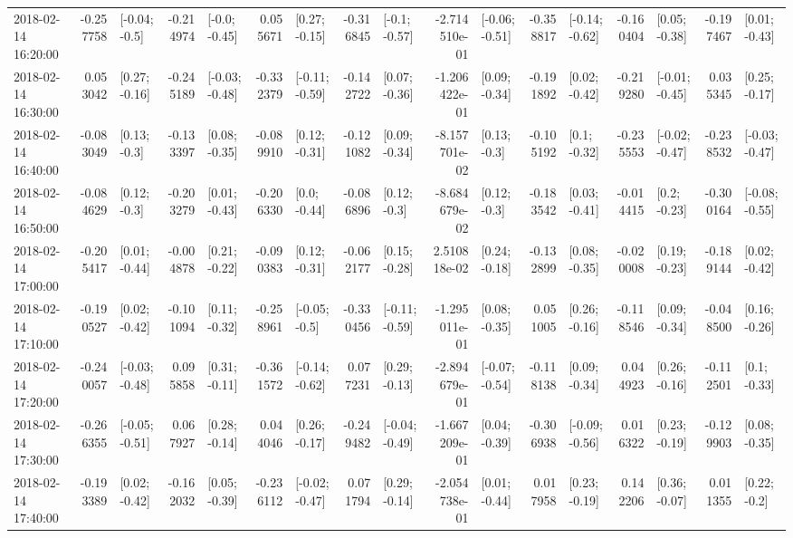 \begin{tabular}{lrlrlrlrlrlrlrlrl}
2018-02-14 16:20:00 & -0.257758 &   [-0.04; -0.5] & -0.214974 &   [-0.0; -0.45] &  0.055671 &   [0.27; -0.15] & -0.316845 &   [-0.1; -0.57] & -2.714510e-01 &  [-0.06; -0.51] & -0.358817 &  [-0.14; -0.62] & -0.160404 &   [0.05; -0.38] & -0.197467 &   [0.01; -0.43] \\
2018-02-14 16:30:00 &  0.053042 &   [0.27; -0.16] & -0.245189 &  [-0.03; -0.48] & -0.332379 &  [-0.11; -0.59] & -0.142722 &   [0.07; -0.36] & -1.206422e-01 &   [0.09; -0.34] & -0.191892 &   [0.02; -0.42] & -0.219280 &  [-0.01; -0.45] &  0.035345 &   [0.25; -0.17] \\
2018-02-14 16:40:00 & -0.083049 &    [0.13; -0.3] & -0.133397 &   [0.08; -0.35] & -0.089910 &   [0.12; -0.31] & -0.121082 &   [0.09; -0.34] & -8.157701e-02 &    [0.13; -0.3] & -0.105192 &    [0.1; -0.32] & -0.235553 &  [-0.02; -0.47] & -0.238532 &  [-0.03; -0.47] \\
2018-02-14 16:50:00 & -0.084629 &    [0.12; -0.3] & -0.203279 &   [0.01; -0.43] & -0.206330 &    [0.0; -0.44] & -0.086896 &    [0.12; -0.3] & -8.684679e-02 &    [0.12; -0.3] & -0.183542 &   [0.03; -0.41] & -0.014415 &    [0.2; -0.23] & -0.300164 &  [-0.08; -0.55] \\
2018-02-14 17:00:00 & -0.205417 &   [0.01; -0.44] & -0.004878 &   [0.21; -0.22] & -0.090383 &   [0.12; -0.31] & -0.062177 &   [0.15; -0.28] &  2.510818e-02 &   [0.24; -0.18] & -0.132899 &   [0.08; -0.35] & -0.020008 &   [0.19; -0.23] & -0.189144 &   [0.02; -0.42] \\
2018-02-14 17:10:00 & -0.190527 &   [0.02; -0.42] & -0.101094 &   [0.11; -0.32] & -0.258961 &   [-0.05; -0.5] & -0.330456 &  [-0.11; -0.59] & -1.295011e-01 &   [0.08; -0.35] &  0.051005 &   [0.26; -0.16] & -0.118546 &   [0.09; -0.34] & -0.048500 &   [0.16; -0.26] \\
2018-02-14 17:20:00 & -0.240057 &  [-0.03; -0.48] &  0.095858 &   [0.31; -0.11] & -0.361572 &  [-0.14; -0.62] &  0.077231 &   [0.29; -0.13] & -2.894679e-01 &  [-0.07; -0.54] & -0.118138 &   [0.09; -0.34] &  0.044923 &   [0.26; -0.16] & -0.112501 &    [0.1; -0.33] \\
2018-02-14 17:30:00 & -0.266355 &  [-0.05; -0.51] &  0.067927 &   [0.28; -0.14] &  0.044046 &   [0.26; -0.17] & -0.249482 &  [-0.04; -0.49] & -1.667209e-01 &   [0.04; -0.39] & -0.306938 &  [-0.09; -0.56] &  0.016322 &   [0.23; -0.19] & -0.129903 &   [0.08; -0.35] \\
2018-02-14 17:40:00 & -0.193389 &   [0.02; -0.42] & -0.162032 &   [0.05; -0.39] & -0.236112 &  [-0.02; -0.47] &  0.071794 &   [0.29; -0.14] & -2.054738e-01 &   [0.01; -0.44] &  0.017958 &   [0.23; -0.19] &  0.142206 &   [0.36; -0.07] &  0.011355 &    [0.22; -0.2] \\

\end{tabular}
